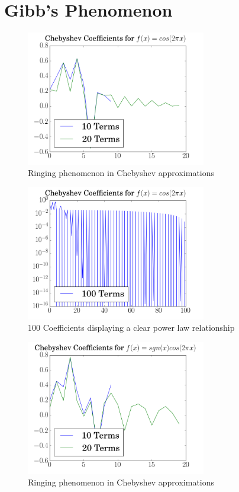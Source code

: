 \documentclass[12pt]{article}
\begin{document}
  

  \clearpage 

  \section{Gibb's Phenomenon}
 
   
  \begin{figure}[h!]
    \centering
    \includegraphics[width=0.7\textwidth]{Problem6ia.png}
    \caption{Ringing phenomenon in Chebyshev approximations}
  \end{figure}

  \begin{figure}[h!]
    \centering
    \includegraphics[width=0.7\textwidth]{Problem6ib.png}
    \caption{100 Coefficients displaying a clear power law relationship}
  \end{figure}
 
   
  \begin{figure}[h!]
    \centering
    \includegraphics[width=0.7\textwidth]{Problem6iia.png}
    \caption{Ringing phenomenon in Chebyshev approximations}
  \end{figure}
\end{document}
